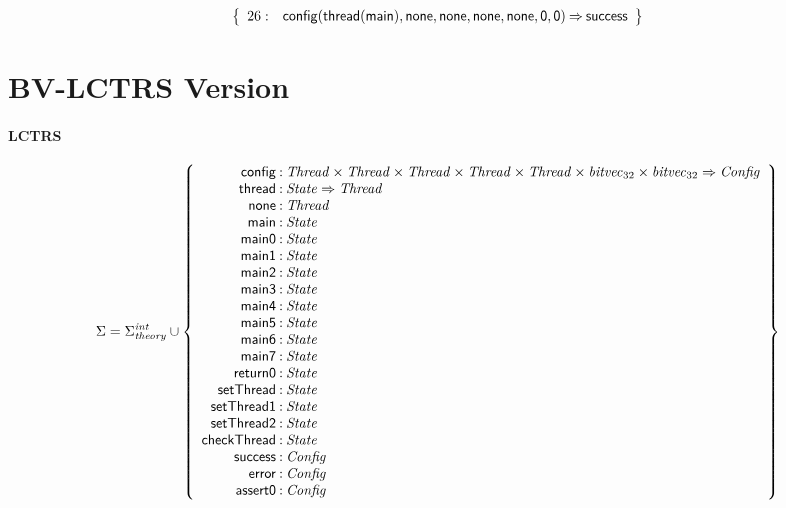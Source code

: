 \documentclass[a4paper]{article}
\newcommand{\Sort}[1]{\mathit{#1}}
\newcommand{\symb}[1]{\mathsf{#1}}
\newcommand{\Sigmainttheory}{\Sigma^{\mathit{int}}_{\mathit{theory}}}
\begin{document}
\begin{landscape}
\[
\left\{
\begin{array}{rr@{\>}c@{\>}ll}
\mathrm{26} : 
 & \symb{config}(\symb{thread}(\symb{main}),\symb{none},\symb{none},\symb{none},\symb{none},\symb{0},\symb{0})
 & \Rightarrow 
 & \symb{success}\\

\end{array}
\right\}
\]


\newpage
\section*{BV-LCTRS Version}

\scriptsize

\paragraph{LCTRS}

\[
\Sigma = 
\Sigmainttheory \cup\left\{
\begin{array}{r@{\>}c@{\>}l}
\symb{config} & : & \Sort{Thread} \times \Sort{Thread} \times \Sort{Thread} \times \Sort{Thread} \times \Sort{Thread} \times \Sort{bitvec}_{32} \times \Sort{bitvec}_{32} \Rightarrow \Sort{Config}\\
\symb{thread} & : & \Sort{State} \Rightarrow \Sort{Thread}\\
\symb{none} & : & \Sort{Thread}\\
\symb{main} & : & \Sort{State}\\
\symb{main0} & : & \Sort{State}\\
\symb{main1} & : & \Sort{State}\\
\symb{main2} & : & \Sort{State}\\
\symb{main3} & : & \Sort{State}\\
\symb{main4} & : & \Sort{State}\\
\symb{main5} & : & \Sort{State}\\
\symb{main6} & : & \Sort{State}\\
\symb{main7} & : & \Sort{State}\\
\symb{return0} & : & \Sort{State}\\
\symb{setThread} & : & \Sort{State}\\
\symb{setThread1} & : & \Sort{State}\\
\symb{setThread2} & : & \Sort{State}\\
\symb{checkThread} & : & \Sort{State}\\
\symb{success} & : & \Sort{Config}\\
\symb{error} & : & \Sort{Config}\\
\symb{assert0} & : & \Sort{Config}\\
\end{array}
\right\}
\]


\end{landscape}
\end{document}
